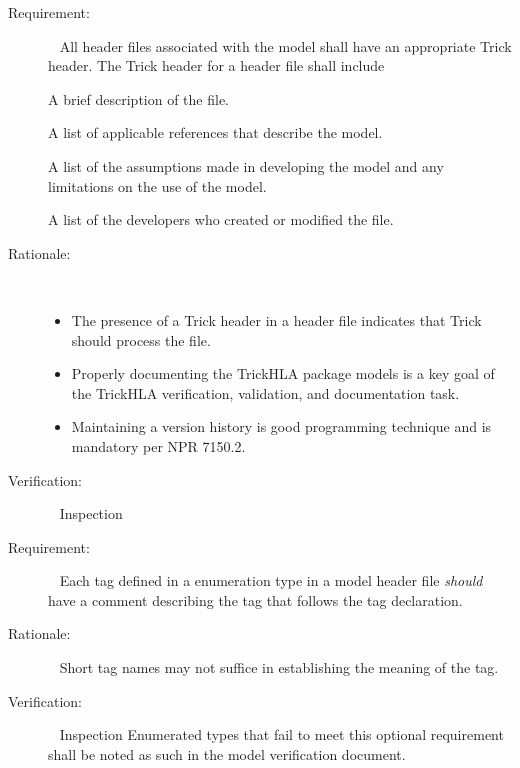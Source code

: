 \documentclass[twoside,11pt,titlepage]{report}
\begin{document}
\label{reqt:h_trick_header}
\begin{description}
  \item[Requirement:]\ \newline
    All header files associated with the model shall have an appropriate
    Trick header.  The Trick header for a header file shall include

    \label{reqt:h_trick_header_purpose}
      A brief description of the file.

    \label{reqt:h_trick_header_refs}
      A list of applicable references that describe the model.

    \label{reqt:h_trick_header_assum}
      A list of the assumptions made in developing the model and
      any limitations on the use of the model.

    \label{reqt:h_trick_header_prog}
      A list of the developers who created or modified the file.

  \item[Rationale:]\ \\[-20pt]
    \begin{itemize}
      \item The presence of a Trick header in a header file
        indicates that Trick should process the file.
      \item Properly documenting the TrickHLA package models
        is a key goal of the TrickHLA verification,
        validation, and documentation task.
      \item Maintaining a version history is good programming
        technique and is mandatory per NPR 7150.2.
    \end{itemize}

  \item[Verification:]\ \newline
    Inspection
\end{description}

\label{reqt:enum_trick_comments}
\begin{description}
  \item[Requirement:]\ \newline
    Each tag defined in a enumeration type in a model header
    file {\em should} have a comment describing the tag that follows
    the tag declaration.

  \item[Rationale:]\ \newline
    Short tag names may not suffice in establishing
    the meaning of the tag.

  \item[Verification:]\ \newline
    Inspection \newline
    Enumerated types that fail to meet this optional requirement
    shall be noted as such in the model verification document.
\end{description}
\end{document}

